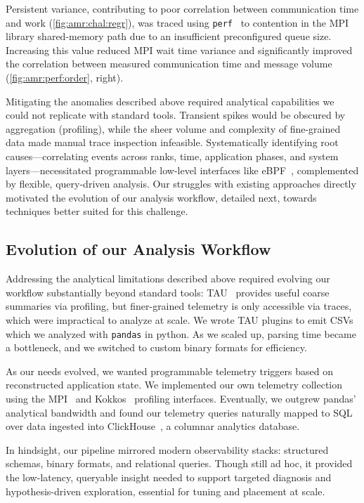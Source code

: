Persistent variance, contributing to poor correlation between communication time and work
(\cref{fig:amr:chal:regr}), was traced using \texttt{perf}~\cite{:PerfLinuxProfiling} to contention in the
MPI library shared-memory path due to an insufficient preconfigured queue size.
Increasing this value reduced MPI wait time variance and significantly improved the correlation
between measured communication time and message volume (\cref{fig:amr:perf:order}, right).

Mitigating the anomalies described above required analytical capabilities we could not replicate
with standard tools.
Transient spikes would be obscured by aggregation (profiling), while the sheer volume and
complexity of fine-grained data made manual trace inspection infeasible.
Systematically identifying root causes---correlating events across ranks, time, application phases,
and system layers---necessitated programmable low-level interfaces like eBPF~\cite{:eBPF},
complemented by flexible, query-driven analysis.
Our struggles with existing approaches directly motivated the evolution of our analysis workflow,
detailed next, towards techniques better suited for this challenge.

\subsection{Evolution of our Analysis Workflow}
\label{sec:amr:tele:pipe}

Addressing the analytical limitations described above required evolving our workflow substantially
beyond standard tools: TAU~\cite{Shend2006:TAU} provides useful coarse summaries via profiling, but
finer-grained telemetry is only accessible via traces, which were impractical to analyze at scale.
We wrote TAU plugins to emit CSVs which we analyzed with \texttt{pandas} in python.
As we scaled up, parsing time became a bottleneck, and we switched to custom binary formats for
efficiency.

As our needs evolved, we wanted programmable telemetry triggers based on reconstructed application
state.
We implemented our own telemetry collection using the MPI~\cite{:MPI} and
Kokkos~\cite{Hammo2018:KokkosP} profiling interfaces.
Eventually, we outgrew pandas’ analytical bandwidth and found our telemetry queries naturally
mapped to SQL over data ingested into ClickHouse~\cite{Schul2024:ClickHouse}, a columnar analytics
database.

In hindsight, our pipeline mirrored modern observability stacks: structured schemas, binary
formats, and relational queries.
Though still ad hoc, it provided the low-latency, queryable insight needed to support targeted
diagnosis and hypothesis-driven exploration, essential for tuning and placement at scale.

